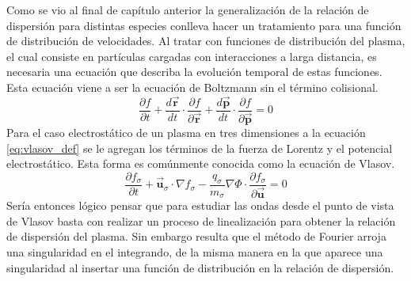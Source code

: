 \documentclass[../tesis_main_file.tex]{subfiles}
\begin{document}
Como se vio al final de capítulo anterior la generalización de la relación de dispersión para distintas especies conlleva hacer un tratamiento para una función de distribución de velocidades. 
Al tratar con funciones de distribución del plasma, el cual consiste en partículas cargadas con interacciones a larga distancia, es necesaria una ecuación que describa la evolución temporal de estas funciones. Esta ecuación viene a ser la ecuación de Boltzmann sin el término colisional. \cite{bellan2008fundamentals}\\
\begin{equation}
\label{eq:vlasov_def}
\frac{\partial f}{\partial t} + \frac{d\overrightarrow{\textbf{r}}}{dt}\cdot \frac{\partial f}{\partial \overrightarrow{\textbf{r}}} + \frac{d \overrightarrow{\textbf{p}}}{dt}\cdot \frac{\partial f}{\partial \overrightarrow{\textbf{p}}}=0
\end{equation}
Para el caso electrostático de un plasma en tres dimensiones a la ecuación \ref{eq:vlasov_def} se le agregan los términos de la fuerza de Lorentz y el potencial electrostático. Esta forma es comúnmente conocida como la ecuación de Vlasov.
\begin{equation}
\label{eq:vlasov-poisson_3D}
\frac{\partial f_{\sigma}}{\partial t} + \overrightarrow{\textbf{u}}_{\sigma} \cdot \nabla f_{\sigma} -\frac{q_{\sigma}}{m_{\sigma}}\nabla \Phi \cdot \frac{\partial f_{\sigma}}{\partial \overrightarrow{\textbf{u}}}=0
\end{equation}
Sería entonces lógico pensar que para estudiar las ondas desde el punto de vista de Vlasov basta con realizar un proceso de linealización para obtener la relación de dispersión del plasma. Sin embargo resulta que el método de Fourier arroja una singularidad en el integrando, de la misma manera en la que aparece una singularidad al insertar una función de distribución en la relación de dispersión.\\
\end{document}

